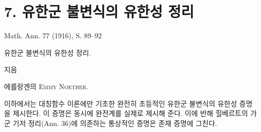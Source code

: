 
\section*{7. 유한군 불변식의 유한성 정리}
\begin{center}
Math. Ann. 77 (1916), S. 89--92
\end{center}

\begin{center}
{\Large 유한군 불변식의 유한성 정리.}\par
\vspace{1.2em}
지음\par
\vspace{0.8em}
에를랑겐의 {\scshape Emmy Noether}.
\end{center}

이하에서는 대칭함수 이론에만 기초한 완전히 초등적인 유한군 불변식의 유한성 증명을 제시한다. 이 증명은 동시에 완전계를 실제로 제시해 준다. 이에 반해 힐베르트의 가군 기저 정리(Ann. 36)에 의존하는 통상적인 증명은 존재 증명에 그친다.
